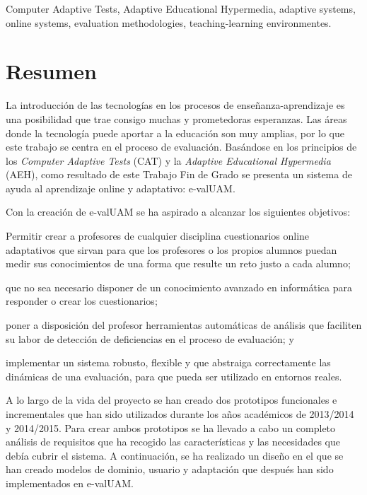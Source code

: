 \begin{keywordsEn}
Computer Adaptive Tests, Adaptive Educational Hypermedia, adaptive systems, online systems, evaluation methodologies, teaching-learning environmentes.
\end{keywordsEn}

\chapter*{Resumen}

\begin{abstractEs}
La introducción de las tecnologías en los procesos de enseñanza-aprendizaje es una posibilidad que trae consigo muchas y prometedoras esperanzas. Las áreas donde la tecnología puede aportar a la educación son muy amplias, por lo que este trabajo se centra en el proceso de evaluación. Basándose en los principios de los \textit{Computer Adaptive Tests} (\acrshort{CAT}) y la \textit{Adaptive Educational Hypermedia} (\acrshort{AEH}), como resultado de este Trabajo Fin de Grado se presenta un sistema de ayuda al aprendizaje online y adaptativo: e-valUAM.

Con la creación de e-valUAM se ha aspirado a alcanzar los siguientes objetivos: 
\begin{enumerate*}[label=\alph*\upshape)]
\item Permitir crear a profesores de cualquier disciplina cuestionarios online adaptativos que sirvan para que los profesores o los propios alumnos puedan medir sus conocimientos de una forma que resulte un reto justo a cada alumno; 
\item que no sea necesario disponer de un conocimiento avanzado en informática para responder o crear los cuestionarios;
\item poner a disposición del profesor herramientas automáticas de análisis que faciliten su labor de detección de deficiencias en el proceso de evaluación; y 
\item implementar un sistema robusto, flexible y que abstraiga correctamente las dinámicas de una evaluación, para que pueda ser utilizado en entornos reales.
\end{enumerate*}

A lo largo de la vida del proyecto se han creado dos prototipos funcionales e incrementales que han sido utilizados durante los años académicos de 2013/2014 y 2014/2015. Para crear ambos prototipos se ha llevado a cabo un completo análisis de requisitos que ha recogido las características y las necesidades que debía cubrir el sistema. A continuación, se ha realizado un diseño en el que se han creado modelos de dominio, usuario y adaptación que después han sido implementados en e-valUAM. 


\end{abstractEs}
